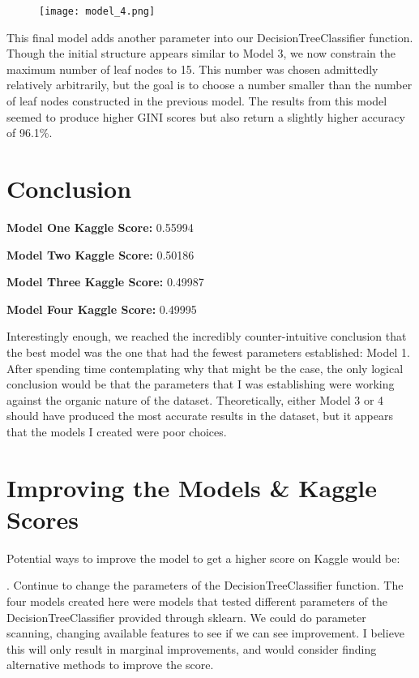 \documentclass[notitlepage]{report}
\begin{document}
\begin{figure}[H]
	\centering
	\texttt{[image: model\_4.png]}
\end{figure}

This final model adds another parameter into our DecisionTreeClassifier function. Though the initial structure appears similar to Model 3, we now constrain the maximum number of leaf nodes to 15. This number was chosen admittedly relatively arbitrarily, but the goal is to choose a number smaller than the number of leaf nodes constructed in the previous model. The results from this model seemed to produce higher GINI scores but also return a slightly higher accuracy of 96.1\%. 

\section*{Conclusion}

\qquad \textbf{Model One Kaggle Score:} 0.55994

\qquad \textbf{Model Two Kaggle Score:} 0.50186

\qquad \textbf{Model Three Kaggle Score:} 0.49987

\qquad \textbf{Model Four Kaggle Score:} 0.49995

Interestingly enough, we reached the incredibly counter-intuitive conclusion that the best model was the one that had the fewest parameters established: Model 1. After spending time contemplating why that might be the case, the only logical conclusion would be that the parameters that I was establishing were working against the organic nature of the dataset. Theoretically, either Model 3 or 4 should have produced the most accurate results in the dataset, but it appears that the models I created were poor choices.

\section*{Improving the Models \& Kaggle Scores}
Potential ways to improve the model to get a higher score on Kaggle would be:

. Continue to change the parameters of the DecisionTreeClassifier function. The four models created here were models that tested different parameters of the DecisionTreeClassifier provided through sklearn. We could do parameter scanning, changing available features to see if we can see improvement. I believe this will only result in marginal improvements, and would consider finding alternative methods to improve the score.
\end{document}
